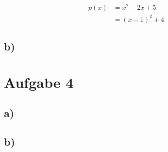 \documentclass[a4paper, 11pt]{article}
\begin{document}
\begin{align*}
    p(x) &= x^2 - 2x + 5 \\
    &= (x - 1)^2 + 4
\end{align*}

\subsection{b)}
\label{sec:orgb44cc2d}
\section{Aufgabe 4}
\label{sec:org54962eb}
\subsection{a)}
\label{sec:org75abdbd}
\subsection{b)}
\label{sec:org303bfd9}
\end{document}

